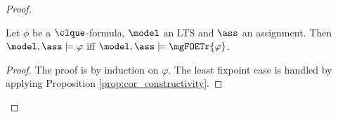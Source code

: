 \begin{proof}
\begin{proposition}\label{thm:guard_wmso}
Let $\phi$ be a $\clque$-formula, $\model$ an LTS and $\ass$ an assignment.
Then $\model, \ass \models \varphi$ iff $\model, \ass \models \mgFOETr{\varphi}$.
\end{proposition}
\begin{proof}
The proof is by induction on $\varphi$. The least fixpoint case is handled by applying Proposition \ref{prop:cor_constructivity}.
%

\end{proof}
\end{proof}
